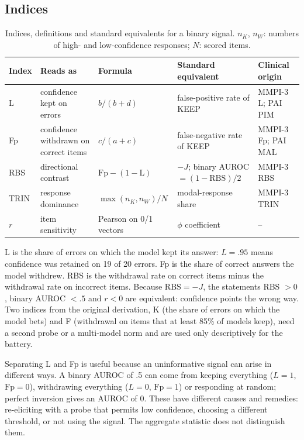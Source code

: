 \documentclass[11pt,a4paper]{article}
\begin{document}
\subsection{Indices}

\begin{table}[t]
\centering
\caption{Indices, definitions and standard equivalents for a binary signal. $n_K$, $n_W$: numbers of high- and low-confidence responses; $N$: scored items.}
\label{tab:indices}
\small
\begin{tabular}{l p{2.9cm} l p{3.3cm} l}
\toprule
Index & Reads as & Formula & Standard equivalent & Clinical origin \\
\midrule
L & confidence kept on errors & $b/(b+d)$ & false-positive rate of KEEP & MMPI-3 L; PAI PIM \\
Fp & confidence withdrawn on correct items & $c/(a+c)$ & false-negative rate of KEEP & MMPI-3 Fp; PAI MAL \\
RBS & directional contrast & $\text{Fp} - (1-\text{L})$ & $-J$; binary AUROC $= (1-\text{RBS})/2$ & MMPI-3 RBS \\
TRIN & response dominance & $\max(n_K,n_W)/N$ & modal-response share & MMPI-3 TRIN \\
$r$ & item sensitivity & Pearson on 0/1 vectors & $\phi$ coefficient & -- \\
\bottomrule
\end{tabular}
\end{table}

L is the share of errors on which the model kept its answer: $L = .95$ means confidence was retained on 19 of 20 errors. Fp is the share of correct answers the model withdrew. RBS is the withdrawal rate on correct items minus the withdrawal rate on incorrect items. Because $\text{RBS} = -J$, the statements RBS $> 0$, binary AUROC $< .5$ and $r < 0$ are equivalent: confidence points the wrong way. Two indices from the original derivation, K (the share of errors on which the model bets) and F (withdrawal on items that at least 85\% of models keep), need a second probe or a multi-model norm and are used only descriptively for the battery.

Separating L and Fp is useful because an uninformative signal can arise in different ways. A binary AUROC of .5 can come from keeping everything ($L = 1$, $\text{Fp} = 0$), withdrawing everything ($L = 0$, $\text{Fp} = 1$) or responding at random; perfect inversion gives an AUROC of 0. These have different causes and remedies: re-eliciting with a probe that permits low confidence, choosing a different threshold, or not using the signal. The aggregate statistic does not distinguish them.
\end{document}
